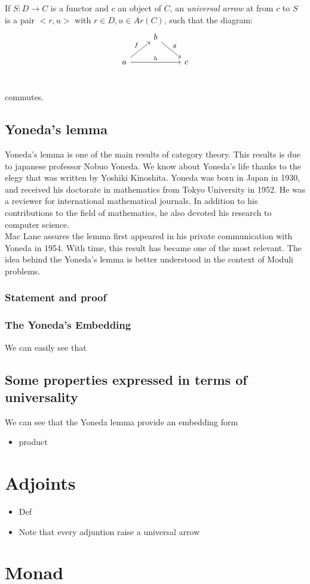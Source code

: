 \begin{definition}
  If $S: D \to C$ is a functor and $c$ an object of $C$, an \emph{universal arrow} at from $c$ to $S$ is a pair $<r,u>$ with $r\in D, u \in Ar(C)$, such that the diagram:
  \[
    \begin{tikzcd}
      & b \arrow[rd, "g"]& \\
      a\arrow[ru, "f"] \arrow[rr, "h"] && c\\
    \end{tikzcd}
  \]

  commutes. 
\end{definition}

\subsection{Yoneda's lemma}
Yoneda's lemma is one of the main results of category theory. This results is due to japanese professor Nobuo Yoneda. We know about Yoneda's life thanks to the elegy that was written by Yoshiki Kinoshita\cite{yonedaLife}. Yoneda was born in Japan in 1930, and received his doctorate in mathematics from Tokyo University in 1952. He was a reviewer for international mathematical journals. In addition to his contributions to the field of mathematics, he also devoted his research to computer science.\\

Mac Lane\cite{mac2013categories} assures the lemma first appeared in his private communication with Yoneda in 1954. With time, this result has became one of the most relevant. The idea behind the Yoneda's lemma is better understood in the context of Moduli problems. 

\subsubsection{Statement and proof}

\subsubsection{The Yoneda's Embedding}
We can easily see that 


\subsection{Some properties expressed in terms of universality}
We can see that the Yoneda lemma provide an embedding form 

\begin{itemize}
\item product \label{prod-univ}
\end{itemize}
\section{Adjoints}
\begin{itemize}
\item Def
\item Note that every adjuntion raise a universal arrow
\end{itemize}

\section{Monad}
